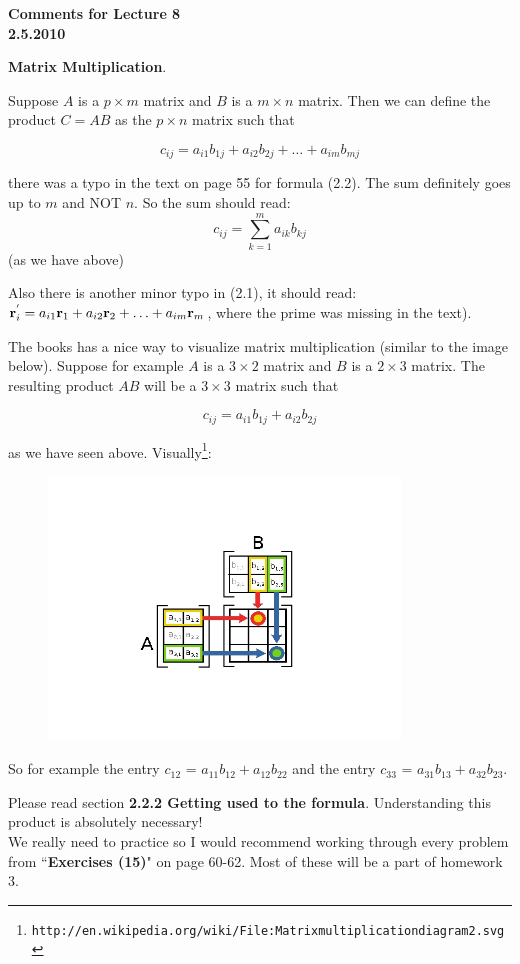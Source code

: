 \documentclass[12pt]{article}
\begin{document}
\begin{center}
{\large \bf Comments for Lecture 8}\\
\bf{2.5.2010}
\end{center}


\begin{center}
{\bf Matrix Multiplication}.  
\end{center}

Suppose $A$ is a $p\times m$ matrix and $B$ is a $m\times n$ matrix.  Then we can define the product $C=AB$ as the $p\times n$ matrix such that

\[
c_{ij} = a_{i1}b_{1j} + a_{i2}b_{2j} + \ldots + a_{im}b_{mj}
 \]

 there was a typo in the text on page 55 for formula (2.2). The sum definitely goes up to $m$ and NOT $n$.  So the sum should read:
\[c_{ij}=\sum_{k=1}^m a_{ik} b_{kj} \] (as we have above)

\noindent  Also there is another minor typo in (2.1), it should read: ${\bf r}_i^{'}=a_{i1}{\bf r}_1+a_{i2}{\bf r}_2+\ldots+a_{im}{\bf r}_m$, where the prime was missing in the text).

The books has a nice way to visualize matrix multiplication (similar to the image below).  Suppose for example $A$ is a $3 \times 2$ matrix and $B$ is a $2 \times 3$ matrix.  The resulting product $AB$ will be a $3 \times 3$ matrix such that 

\[ c_{ij} = a_{i1}b_{1j} + a_{i2}b_{2j} \]

\noindent as we have seen above.  Visually\footnote{ \texttt{http://en.wikipedia.org/wiki/File:Matrix\textunderscore multiplication\textunderscore diagram\textunderscore 2.svg} }:
\begin{figure}[h!]
  \centering
\includegraphics[height=70mm]{mult.jpg}
\end{figure}

So for example the entry \colorbox{darkyellow}{$c_{12}$} = $a_{11}b_{12}+a_{12}b_{22}$ and the entry \colorbox{brightgreen}{$c_{33}$} = $a_{31}b_{13}+a_{32}b_{23}$.

\noindent Please read section {\bf 2.2.2 Getting used to the formula}.  Understanding this product is absolutely necessary! \\

\noindent We really need to practice so I would recommend working through every problem from ``{\bf Exercises (15)}" on page 60-62.  Most of these will be a part of homework 3.

\end{document}
